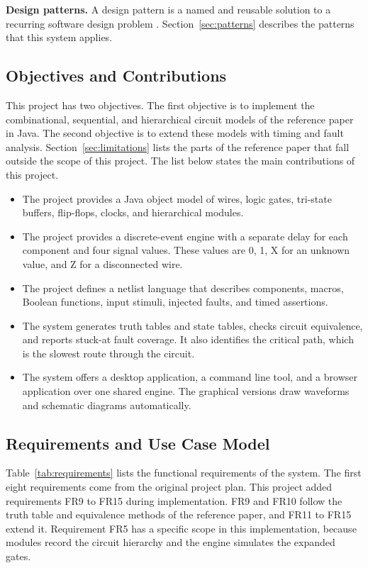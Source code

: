 \textbf{Design patterns.}
A design pattern is a named and reusable solution to a recurring software design problem .
Section~\ref{sec:patterns} describes the patterns that this system applies.

\subsection{Objectives and Contributions}

This project has two objectives.
The first objective is to implement the combinational, sequential, and hierarchical circuit models of the reference paper in Java.
The second objective is to extend these models with timing and fault analysis.
Section~\ref{sec:limitations} lists the parts of the reference paper that fall outside the scope of this project.
The list below states the main contributions of this project.

\begin{itemize}
\item The project provides a Java object model of wires, logic gates, tri-state buffers, flip-flops, clocks, and hierarchical modules.
\item The project provides a discrete-event engine with a separate delay for each component and four signal values. These values are 0, 1, X for an unknown value, and Z for a disconnected wire.
\item The project defines a netlist language that describes components, macros, Boolean functions, input stimuli, injected faults, and timed assertions.
\item The system generates truth tables and state tables, checks circuit equivalence, and reports stuck-at fault coverage. It also identifies the critical path, which is the slowest route through the circuit.
\item The system offers a desktop application, a command line tool, and a browser application over one shared engine. The graphical versions draw waveforms and schematic diagrams automatically.
\end{itemize}

\subsection{Requirements and Use Case Model}

Table~\ref{tab:requirements} lists the functional requirements of the system.
The first eight requirements come from the original project plan.
This project added requirements FR9 to FR15 during implementation.
FR9 and FR10 follow the truth table and equivalence methods of the reference paper, and FR11 to FR15 extend it.
Requirement FR5 has a specific scope in this implementation, because modules record the circuit hierarchy and the engine simulates the expanded gates.

